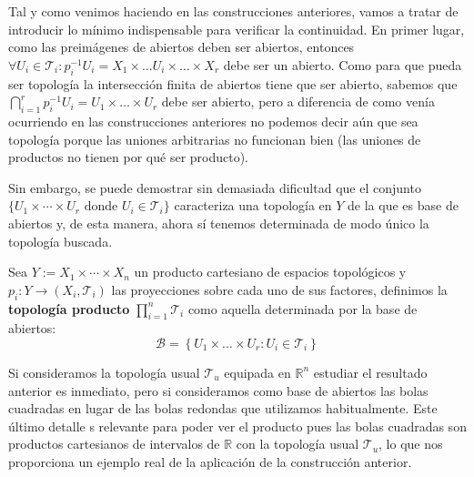 Tal y como venimos haciendo en las construcciones anteriores, vamos a tratar de introducir lo mínimo indispensable para verificar la continuidad. En primer lugar, como las preimágenes de abiertos deben ser abiertos, entonces $\forall U_i \in \mathcal{T}_i : p_i^{-1}U_i = X_1 \times \ldots U_i \times \ldots \times X_r $ debe ser un abierto. Como para que pueda ser topología la intersección finita de abiertos tiene que ser abierto, sabemos que $\bigcap_{i=1}^{r} p_i^{-1}U_i = U_1 \times \ldots \times U_r$ debe ser abierto, pero a diferencia de como venía ocurriendo en las construcciones anteriores no podemos decir aún que sea topología porque las uniones arbitrarias no funcionan bien (las uniones de productos no tienen por qué ser producto). 

Sin embargo, se puede demostrar sin demasiada dificultad que el conjunto  $\{U_1 \times \cdots \times U_r \mbox{ donde } U_i \in \mathcal{T}_i\}$ caracteriza una topología en $Y$ de la que es base de abiertos y, de esta manera, ahora sí tenemos determinada de modo único la topología buscada.

\begin{defi}
Sea $Y := X_1\times \cdots \times X_n$ un producto cartesiano de espacios topológicos y $p_i : Y \rightarrow (X_i, \mathcal{T}_i)$ las proyecciones sobre cada uno de sus factores, definimos la \textbf{topología producto} $\prod_{i=1}^n \mathcal{T}_i$ como aquella determinada por la base de abiertos:
\[
\mathcal{B} = \left\{ U_1 \times \ldots \times U_r: U_i \in \mathcal{T}_i \right\}
\]
\end{defi}

\begin{ej}
Si consideramos la topología usual $\mathcal{T}_u$ equipada en $\mathbb{R}^n$ estudiar el resultado anterior es inmediato, pero si consideramos como base de abiertos las bolas cuadradas en lugar de las bolas redondas que utilizamos habitualmente. Este último detalle s relevante para poder ver el producto pues las bolas cuadradas son productos cartesianos de intervalos de $\mathbb{R}$ con la topología usual $\mathcal{T}_u$, lo que nos proporciona un ejemplo real de la aplicación de la construcción anterior.
\end{ej}

